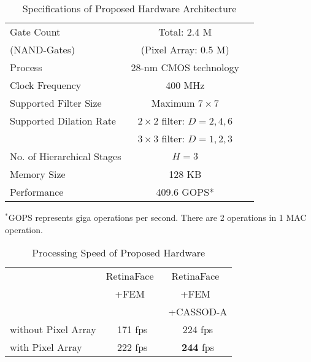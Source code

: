 \documentclass[10pt,twocolumn,letterpaper]{article}
\begin{document}
\begin{table}
\caption{Specifications of Proposed Hardware Architecture}
\begin{center}
\begin{tabular}{l|cc}
\hline
Gate Count                 & Total: 2.4 M \\
(NAND-Gates)               & (Pixel Array: 0.5 M)\\
\hline                     
Process                    & 28-nm CMOS technology\\
\hline                     
Clock Frequency            & 400 MHz\\
\hline                     
Supported Filter Size      & Maximum $7 \times 7$\\
Supported Dilation Rate    & $2 \times 2$ filter: $D=2, 4, 6$\\
                           & $3 \times 3$ filter: $D=1, 2, 3$\\
No. of Hierarchical Stages & $H = 3$\\
\hline
Memory Size                & 128 KB\\
\hline                     
Performance                & 409.6 GOPS*\\
\hline
\end{tabular}
\end{center}
{\footnotesize
$^{*}$GOPS represents giga operations per second. There are 2 operations in 1 MAC operation.
}
\label{tab:spec}
\end{table}


\begin{table}
\caption{Processing Speed of Proposed Hardware}
\begin{center}
\begin{tabular}{l|cc}
\hline
                    & RetinaFace~\cite{Deng19} & RetinaFace~\cite{Deng19} \\
                    & +FEM~\cite{Li18_1}       & +FEM~\cite{Li18_1} \\
                    &                          & +CASSOD-A \\
\hline                     
without Pixel Array & 171 fps & 224 fps\\
\hline
with Pixel Array    & 222 fps & \textbf{244} fps\\
\hline
\end{tabular}
\end{center}
\label{tab:speed}
\end{table}
\end{document}
